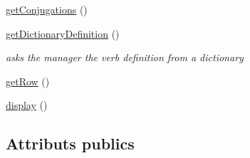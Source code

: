 \begin{DoxyCompactItemize}
\item 
\hyperlink{classConjugationBase_ae5b10d1201dfc7ed1c56b1f5a073bbdb}{get\+Conjugations} ()
\item 
\hyperlink{classConjugationBase_aae493e154b07045a3ea072760ac44ef4}{get\+Dictionary\+Definition} ()
\begin{DoxyCompactList}\small\item\em asks the manager the verb definition from a dictionary \end{DoxyCompactList}\item 
\hyperlink{classConjugationBase_a0a30ad37c192a95d0986b77999a2ce5d}{get\+Row} ()
\item 
\hyperlink{classConjugationBase_a7a50c953a3f949a7740d3fb51c4b929d}{display} ()
\end{DoxyCompactItemize}
\subsection*{Attributs publics}

